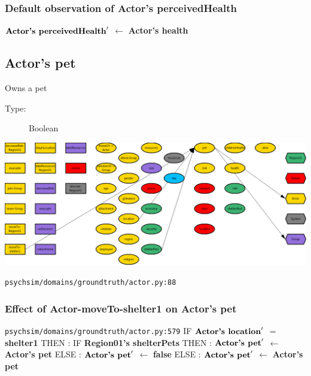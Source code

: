 \documentclass{article}%
\begin{document}
\subsubsection{Default observation of Actor's perceivedHealth}%
\label{ssubsec:Default observation of Actor's perceivedHealth}%
\begin{flushleft}%
$\mbox{\textbf{Actor's perceivedHealth}} '$%
$\leftarrow$%
\textbf{Actor's health}%
\end{flushleft}

%
\subsection{Actor's pet}%
\label{subsec:Actor's pet}%
Owns a pet%
\begin{description}%
\item[Type:]%
Boolean%
\end{description}%
\includegraphics[width=\textwidth]{images/petOfActor.png}%
\begin{flushleft}%
\verb|psychsim/domains/groundtruth/actor.py:88|%
\end{flushleft}%
\subsubsection{Effect of Actor{-}moveTo{-}shelter1 on Actor's pet}%
\label{ssubsec:Effect of Actor{-}moveTo{-}shelter1 on Actor's pet}%
\begin{flushleft}%
\verb|psychsim/domains/groundtruth/actor.py:579|%
\linebreak%
IF %
$\mbox{\textbf{Actor's location}} '$%
$=$%
\textbf{shelter1}%
\linebreak%
\hspace*{2em}%
THEN %
: %
IF %
\textbf{Region01's shelterPets}%
\linebreak%
\hspace*{4em}%
THEN %
: %
$\mbox{\textbf{Actor's pet}} '$%
$\leftarrow$%
\textbf{Actor's pet}%
\linebreak%
\hspace*{4em}%
ELSE %
: %
$\mbox{\textbf{Actor's pet}} '$%
$\leftarrow$%
\textbf{false}%
\linebreak%
\hspace*{2em}%
ELSE %
: %
$\mbox{\textbf{Actor's pet}} '$%
$\leftarrow$%
\textbf{Actor's pet}%
\end{flushleft}
\end{document}
